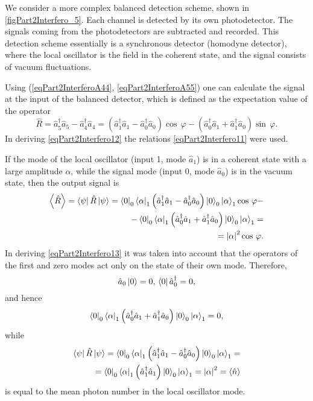 

We consider a more complex balanced detection scheme,
shown in \autoref{figPart2Interfero_5}. Each channel
is detected by its own photodetector. The signals coming from the photodetectors
are subtracted and recorded. This detection scheme essentially is a
synchronous detector (homodyne detector), where the local oscillator is
the field in the coherent state, and the signal consists of vacuum fluctuations.

Using (\ref{eqPart2InterferoA44},
\ref{eqPart2InterferoA55}) one can calculate
the signal at the input of the balanced detector, which is defined as the expectation value
of the operator  
\begin{equation}
\hat{R} = 
\hat{a}_5^{\dag} \hat{a}_5 - 
\hat{a}_4^{\dag} \hat{a}_4 =
\left(
\hat{a}_1^{\dag} \hat{a}_1 - 
\hat{a}_0^{\dag} \hat{a}_0
\right) \cos\,\varphi -
\left(
\hat{a}_0^{\dag} \hat{a}_1 + 
\hat{a}_1^{\dag} \hat{a}_0
\right) \sin\,\varphi.
\label{eqPart2Interfero12}
\end{equation}
In deriving \eqref{eqPart2Interfero12} the relations
\eqref{eqPart2Interfero11} were used.

If the mode of the local oscillator (input 1, mode $\hat{a}_1$) is in
a coherent state with a large amplitude $\alpha$, while the signal mode
(input 0, mode $\hat{a}_0$) is in the vacuum state, then the output signal
is
\begin{eqnarray}
\left<\hat{R}\right> = 
\left<\psi\right|\hat{R} \left|\psi\right> = 
\bra{0}_0\left<\alpha\right|_1
\left(
\hat{a}_1^{\dag} \hat{a}_1 - 
\hat{a}_0^{\dag} \hat{a}_0
\right)
\ket{0}_0\left|\alpha\right>_1
\cos\,\varphi
-
\nonumber \\
-
\bra{0}_0\left<\alpha\right|_1
\left(
\hat{a}_0^{\dag} \hat{a}_1 + 
\hat{a}_1^{\dag} \hat{a}_0
\right) 
\ket{0}_0\left|\alpha\right>_1 = 
\nonumber \\
= \left|\alpha\right|^2 \cos\,\varphi.
\label{eqPart2Interfero13}
\end{eqnarray}
In deriving \eqref{eqPart2Interfero13} it was taken into account that the operators
of the first and zero modes act only on the state of their
own mode. Therefore,
\[
\hat{a}_0\ket{0} = 0, \, 
\bra{0}\hat{a}_0^{\dag} = 0,
\]
and hence 
\[
\bra{0}_0\left<\alpha\right|_1
\left(
\hat{a}_0^{\dag} \hat{a}_1 + 
\hat{a}_1^{\dag} \hat{a}_0
\right) 
\ket{0}_0\left|\alpha\right>_1 = 0,
\]
while
\begin{eqnarray}
\left<\psi\right|\hat{R} \left|\psi\right>= 
\bra{0}_0\left<\alpha\right|_1
\left(
\hat{a}_1^{\dag} \hat{a}_1 - 
\hat{a}_0^{\dag} \hat{a}_0
\right)
\ket{0}_0\left|\alpha\right>_1
=
\nonumber \\
=
\bra{0}_0\left<\alpha\right|_1
\left(
\hat{a}_1^{\dag} \hat{a}_1
\right)
\ket{0}_0\left|\alpha\right>_1
= \left|\alpha\right|^2 = 
\left<\hat{n}\right>
\nonumber
\end{eqnarray}
is equal to the mean photon number in the local oscillator mode.

